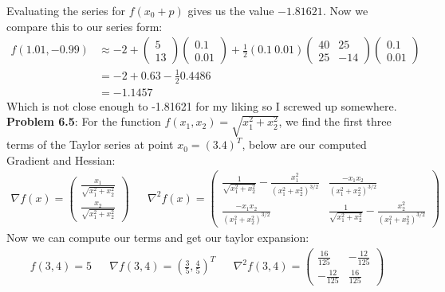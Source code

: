 \documentclass{article}
\begin{document}
Evaluating the series for $f(x_0 + p)$ gives us the value $-1.81621$. Now we compare this to our series form:
\begin{align*}
    f(1.01,-0.99) & \approx 
    -2 + 
    \begin{pmatrix} 5 \\ 13 \end{pmatrix}
        \begin{pmatrix} 0.1 \\ 0.01 \end{pmatrix} 
            + \frac{1}{2}(0.1 \: 0.01)
            \begin{pmatrix}
                40 & 25 \\
                25 & -14
            \end{pmatrix}
        \begin{pmatrix} 0.1 \\ 0.01 \end{pmatrix} \\
            & = -2 +0.63 - \frac{1}{2}0.4486 \\ 
            & = -1.1457
\end{align*}
Which is not close enough to -1.81621 for my liking so I screwed up somewhere. \newline \break
\textbf{Problem 6.5}: For the function $f(x_1, x_2) = \sqrt{x_1^2 + x_2^2}$, we find the first three terms of the Taylor series at point $x_0 = (3.4)^T$, below are our computed Gradient and Hessian:
\begin{align*}
    \nabla f(x) = 
    \begin{pmatrix}
        \frac{x_1}{\sqrt{x_1^2 + x_2^2}} \\  \frac{x_2}{\sqrt{x_1^2 + x_2^2}}
    \end{pmatrix} && 
    \nabla^2 f(x) =
    \begin{pmatrix}
        \frac{1}{\sqrt{x_1^2 + x_2^2}} - \frac{x_1^2}{(x_1^2 + x_2^2)^{3/2}} & \frac{-x_1 x_2}{(x_1^2 + x_2^2)^{3/2}} \\
        \frac{-x_1 x_2}{(x_1^2 + x_2^2)^{3/2}} & \frac{1}{\sqrt{x_1^2 + x_2^2}} - \frac{x_2^2}{(x_1^2 + x_2^2)^{3/2}}
    \end{pmatrix}
\end{align*}
Now we can compute our terms and get our taylor expansion:
\begin{align*}
    f(3, 4) = 5 && \nabla f(3,4) = (\frac{3}{5},\frac{4}{5})^T && 
    \nabla^2 f(3,4) = \begin{pmatrix} \frac{16}{125} & -\frac{12}{125} \\ -\frac{12}{125} & \frac{16}{125} \end{pmatrix}
\end{align*}
\end{document}
